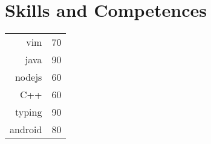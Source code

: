 \section*{Skills and Competences}
\newcommand{\skill}[2]{%
  #1 & #2 \\ %
}

\begin{tabular*}{\textwidth}{r l}
  \skill{vim}{70}
  \skill{java}{90}
  \skill{nodejs}{60}
  \skill{C++}{60}
  \skill{typing}{90}
  \skill{android}{80}
\end{tabular*}

